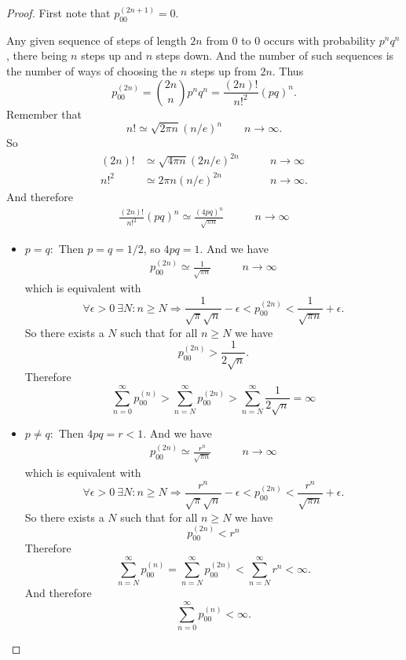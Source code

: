 \begin{proof}
First note that \(p_{00}^{(2n+1)}=0.\)

Any given sequence of steps of length \(2n\) from \(0\) to \(0\) occurs with probability \(p^nq^n\), there being \(n\) steps up and \(n\) steps down. And the number of such sequences is the number of ways of choosing the \(n\) steps up from \(2n\). Thus
\[
p_{00}^{(2n)}={2n\choose n}p^nq^n=\frac{(2n)!}{n!^2}(pq)^n.
\]
Remember that
\[
n! \simeq  \sqrt {2\pi n}(n/e)^n  \qquad n\rightarrow \infty .
\]
So
\begin{align*}
(2n)! &\simeq  \sqrt {4\pi n}(2n/e)^{2n}  &\qquad n\rightarrow \infty \\
n!^{2} &\simeq  {2\pi n}(n/e)^{2n}  &\qquad n\rightarrow \infty .
\end{align*}
And therefore
\begin{align*}
\frac{(2n)!}{n!^2}(pq)^n\simeq \frac{(4pq)^n}{\sqrt {\pi n}} &\qquad n\rightarrow \infty 
\end{align*}

\begin{itemize}
  \item \(p=q:\) Then \(p=q=1/2\), so \(4pq=1\). And we have
\begin{align*}
p_{00}^{(2n)}\simeq \frac{1}{\sqrt {\pi n}} &\qquad n\rightarrow \infty 
\end{align*}
which is equivalent with
\[
\forall \epsilon>0\  \exists N:n\geq N\Longrightarrow \frac{1}{\sqrt {\pi }\sqrt {n}}-\epsilon<p_{00}^{(2n)}<\frac{1}{\sqrt {\pi n}}+\epsilon.
\]
So there exists a \(N\) such that for all \(n\geq N\) we have
\[
p_{00}^{(2n)}>\frac{1}{2\sqrt n}.
\]
Therefore
\[
\sum _{n=0}^\infty p_{00}^{(n)}>\sum _{n=N}^\infty p_{00}^{(2n)}>\sum _{n=N}^\infty \frac{1}{2\sqrt n}=\infty 
\]
  \item \(p\neq q:\) Then \(4pq=r<1.\) And we have
\begin{align*}
p_{00}^{(2n)}\simeq \frac{r^n}{\sqrt {\pi n}} &\qquad n\rightarrow \infty 
\end{align*}
which is equivalent with
\[
\forall \epsilon>0\  \exists N:n\geq N\Longrightarrow \frac{r^n}{\sqrt {\pi }\sqrt {n}}-\epsilon<p_{00}^{(2n)}<\frac{r^n}{\sqrt {\pi n}}+\epsilon.
\]
So there exists a \(N\) such that for all \(n\geq N\)  we have
\[
p_{00}^{(2n)}<r^n
\]
Therefore
\[
\sum _{n=N}^\infty p_{00}^{(n)}=\sum _{n=N}^\infty p_{00}^{(2n)}<\sum _{n=N}^\infty r^n<\infty .
\]
And therefore
\[
\sum _{n=0}^\infty p_{00}^{(n)}<\infty .
\]
\end{itemize}

\end{proof}

